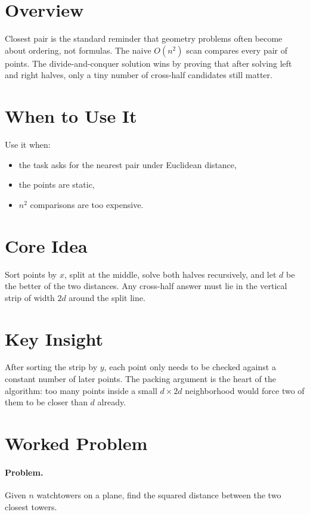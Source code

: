 \section*{Overview}

Closest pair is the standard reminder that geometry problems often become about ordering, not formulas. The naive
\(O(n^2)\) scan compares every pair of points. The divide-and-conquer solution wins by proving that after solving left
and right halves, only a tiny number of cross-half candidates still matter.

\section*{When to Use It}

Use it when:

\begin{itemize}
  \item the task asks for the nearest pair under Euclidean distance,
  \item the points are static,
  \item \(n^2\) comparisons are too expensive.
\end{itemize}

\section*{Core Idea}

Sort points by \(x\), split at the middle, solve both halves recursively, and let \(d\) be the better of the two
distances. Any cross-half answer must lie in the vertical strip of width \(2d\) around the split line.

\section*{Key Insight}

After sorting the strip by \(y\), each point only needs to be checked against a constant number of later points. The
packing argument is the heart of the algorithm: too many points inside a small \(d \times 2d\) neighborhood would force
two of them to be closer than \(d\) already.

\section*{Worked Problem}

\paragraph{Problem.}
Given \(n\) watchtowers on a plane, find the squared distance between the two closest towers.

